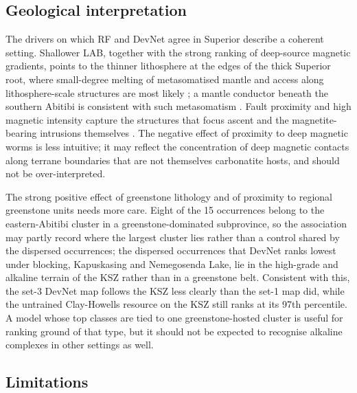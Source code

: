 \documentclass[pdflatex,sn-apa]{sn-jnl}
\begin{document}
\subsection{Geological interpretation}\label{sec:disc-geology}

The drivers on which RF and DevNet agree in Superior describe a coherent setting. Shallower LAB, together with the strong ranking of deep-source magnetic gradients, points to the thinner lithosphere at the edges of the thick Superior root, where small-degree melting of metasomatised mantle and access along lithosphere-scale structures are most likely \citep{Griffin2013,Groves2021,Hoggard2020}; a mantle conductor beneath the southern Abitibi is consistent with such metasomatism \citep{Snyder2021}. Fault proximity and high magnetic intensity capture the structures that focus ascent and the magnetite-bearing intrusions themselves \citep{Thomas2016}. The negative effect of proximity to deep magnetic worms is less intuitive; it may reflect the concentration of deep magnetic contacts along terrane boundaries that are not themselves carbonatite hosts, and should not be over-interpreted.

The strong positive effect of greenstone lithology and of proximity to regional greenstone units needs more care. Eight of the 15 occurrences belong to the eastern-Abitibi cluster in a greenstone-dominated subprovince, so the association may partly record where the largest cluster lies rather than a control shared by the dispersed occurrences; the dispersed occurrences that DevNet ranks lowest under blocking, Kapuskasing and Nemegosenda Lake, lie in the high-grade and alkaline terrain of the KSZ rather than in a greenstone belt. Consistent with this, the set-3 DevNet map follows the KSZ less clearly than the set-1 map did, while the untrained Clay-Howells resource on the KSZ still ranks at its 97th percentile. A model whose top classes are tied to one greenstone-hosted cluster is useful for ranking ground of that type, but it should not be expected to recognise alkaline complexes in other settings as well.

\subsection{Limitations}\label{sec:limitations}
\end{document}
